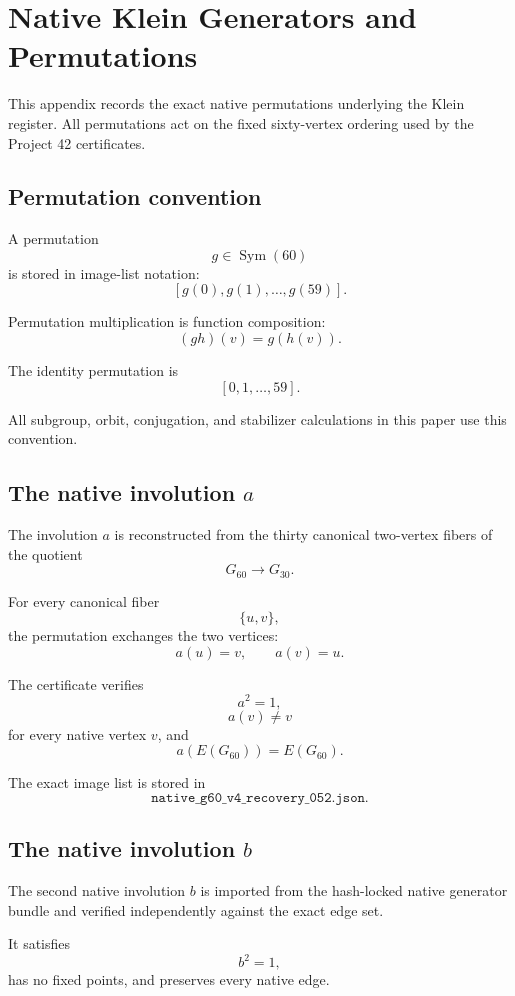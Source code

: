 \section{Native Klein Generators and Permutations}

This appendix records the exact native permutations underlying the
Klein register. All permutations act on the fixed sixty-vertex
ordering used by the Project 42 certificates.

\subsection{Permutation convention}

A permutation
\[
g\in\operatorname{Sym}(60)
\]
is stored in image-list notation:
\[
[g(0),g(1),\ldots,g(59)].
\]

Permutation multiplication is function composition:
\[
(gh)(v)=g(h(v)).
\]

The identity permutation is
\[
[0,1,\ldots,59].
\]

All subgroup, orbit, conjugation, and stabilizer calculations in this
paper use this convention.

\subsection{The native involution \(a\)}

The involution \(a\) is reconstructed from the thirty canonical
two-vertex fibers of the quotient
\[
G_{60}\longrightarrow G_{30}.
\]

For every canonical fiber
\[
\{u,v\},
\]
the permutation exchanges the two vertices:
\[
a(u)=v,
\qquad
a(v)=u.
\]

The certificate verifies
\[
a^2=1,
\]
\[
a(v)\neq v
\]
for every native vertex \(v\), and
\[
a(E(G_{60}))=E(G_{60}).
\]

The exact image list is stored in
\[
\texttt{native\_g60\_v4\_recovery\_052.json}.
\]

\subsection{The native involution \(b\)}

The second native involution \(b\) is imported from the hash-locked
native generator bundle and verified independently against the exact
edge set.

It satisfies
\[
b^2=1,
\]
has no fixed points, and preserves every native edge.

